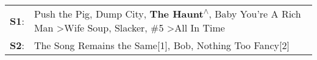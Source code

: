 \begin{supertabular}{p{0.03\textwidth}p{0.92\textwidth}}
 \textbf{S1}:  &  Push the Pig\textsuperscript{}, \enspace Dump City\textsuperscript{}, \enspace \textbf{The Haunt\textsuperscript{$\wedge$}}, \enspace Baby You're A Rich Man\textsuperscript{} \textgreater \enspace Wife Soup\textsuperscript{}, \enspace Slacker\textsuperscript{}, \enspace \#5\textsuperscript{} \textgreater \enspace All In Time\textsuperscript{}  \enspace  \\
 \textbf{S2}:  &                                                                                                                                                                                                                           The Song Remains the Same[1]\textsuperscript{}, \enspace Bob\textsuperscript{}, \enspace Nothing Too Fancy[2]\textsuperscript{}  \enspace  \\
\end{supertabular}

